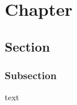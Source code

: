 \documentclass{ltjsreport}
\begin{document}
\tableofcontents

\chapter{Chapter}
\section{Section}
\subsection{Subsection}
text
\end{document}
